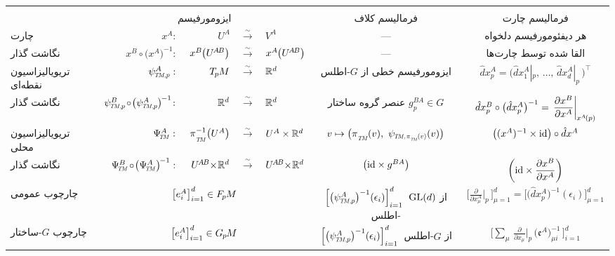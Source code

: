 \def\arraystretch{2.75}%
\setlength\tabcolsep{2.8ex}
\small
\begin{tabular}{ @{\ \ } l r@{\,}r@{\ }c@{\ }l cc @{\ \ } }
	\toprule
	\\[-8.0ex]
	& \multicolumn{4}{c}{ایزومورفیسم}
	& فرمالیسم کلاف
	& فرمالیسم چارت \\
	\midrule[0.07em] %
	چارت
	& $x^A :\ $
	& $U^A$
	& $\xrightarrow{\sim}$
	& $V^A$
	& ---
	& هر دیفئومورفیسم دلخواه
	\\
	نگاشت گذار
	& $x^B \!\circ\! \big(x^A\big)^{-1} :\ $
	& $x^B \mkern-1mu\big( U^{\mkern-2muA\mkern-2muB} \big)$
	& $\xrightarrow{\sim}$
	& $x^A \mkern-1mu\big( U^{\mkern-2muA\mkern-2muB} \big)$
	& ---
	& القا شده توسط چارت‌ها
	\\
	\midrule[0.04em] %
	تریویالیزاسیون نقطه‌ای \hspace*{-3ex}
	& $\psiTMp^A :\ $
	& $T_{\mkern-1.5mu p}\mkern-.5muM$
	& $\xrightarrow{\sim}$
	& $\mathbb{R}^d$
	& ایزومورفیسم خطی از $G$-اطلس
	& $\hat{d}x^A_p = \big( \hat{d}x^A_1|_p,\, \dots,\, \hat{d}x^A_d|_p\, \big)^{\!\top}$
	\\
	نگاشت گذار
	& $\psiTMp^B \mkern-2mu\circ\! \big(\psiTMp^A\big)^{\mkern-2mu-1} \!:\ $
	& $\mathbb{R}^d$
	& $\xrightarrow{\sim}$
	& $\mathbb{R}^d$
	& عنصر گروه ساختار $g_p^{BA} \in G$
	& $\hat{d}x^B_p \circ \big(\hat{d}x^A_p\big)^{-1}
	=\, \displaystyle \frac{\partial x^B}{\partial x^A} \bigg|_{\mkern-1mu x^{\mkern-1mu A}\mkern-2mu(p)} $
	\\
	\midrule[0.04em] %
	تریویالیزاسیون محلی
	& $\PsiTM^A :\ $
	& $\piTM^{-1} \big(U^A\big)$
	& $\xrightarrow{\sim}$
	& $U^A \times \mathbb{R}^d$
	& $v \mapsto \big( \piTM\mkern-1mu(v),\ \psiTMpiv(v) \big)$
	& $\big((x^A)^{-1} \times \mathrm{id}\big) \circ \hat{d}x^A$
	\\
	نگاشت گذار
	& $\PsiTM^B \mkern-2mu\circ\! \big(\PsiTM^A\big)^{\mkern-2mu-1} :\ $
	& $U^{\mkern-2muA\mkern-2muB} \mkern-4mu\times\! \mathbb{R}^d$
	& $\xrightarrow{\sim}$
	& $U^{\mkern-2muA\mkern-2muB} \mkern-4mu\times\! \mathbb{R}^d$
	& $\big(\mathrm{id} \times g^{BA} \big)$
	& $\displaystyle \bigg( \mathrm{id} \times \frac{\partial x^B}{\partial x^A} \bigg)$
	\\
	\midrule[0.07em] %
	چارچوب عمومی
	& \multicolumn{4}{c}{$\big[ e^A_i \big]_{i=1}^d \in F_{\mkern-1.5mu p}\mkern-1.0muM$}
	& $\Big[ \big(\psiTMp^A\big)^{-1} (\epsilon_i) \Big]_{i=1}^d$\ از $\operatorname{GL}(d)$-اطلس
	& $\displaystyle \bigg[\frac{\partial}{\partial x^A_\mu} \bigg|_p \,\bigg]_{\mu=1}^d = \Big[ \big(\hat{d}x^A_p \big)^{-1} (\epsilon_i) \Big]_{\mu=1}^d$
	\\
	چارچوب $G$-ساختار
	& \multicolumn{4}{c}{$\big[ e^A_i \big]_{i=1}^d \in G_{\mkern-1.3mu p}\mkern-1.2muM$}
	& $\Big[ \big(\psiTMp^A\big)^{-1} (\epsilon_i) \Big]_{i=1}^d$\ از $G$-اطلس \kern16pt
	& $\displaystyle \bigg[\sum\nolimits_{\mu}\, \frac{\partial}{\partial x_\mu} \bigg|_p\, \big( \mathfrak{e}^A \big)^{-1}_{\!\mu i}\, \bigg]_{i=1}^d$
	\\
	\bottomrule
\end{tabular}